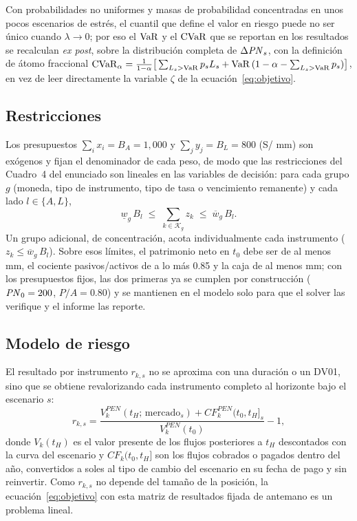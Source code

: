 Con probabilidades no uniformes y masas de probabilidad concentradas en unos pocos escenarios de estrés, el
cuantil que define el valor en riesgo puede no ser único cuando $\lambda \to 0$; por eso el $\operatorname{VaR}$ y el
$\operatorname{CVaR}$ que se reportan en los resultados se recalculan \emph{ex post}, sobre la distribución completa de
$\Delta \mathit{PN}_s$, con la definición de átomo fraccional
$\operatorname{CVaR}_\alpha = \frac{1}{1-\alpha}\big[\sum_{L_s > \operatorname{VaR}} p_s L_s + \operatorname{VaR}\,(1-\alpha - \sum_{L_s > \operatorname{VaR}} p_s)\big]$,
en vez de leer directamente la variable $\zeta$ de la ecuación~\eqref{eq:objetivo}.

\subsection{Restricciones}
Los presupuestos $\sum_i x_i = B_A = 1{,}000$ y $\sum_j y_j = B_L = 800$ (S/ mm) son exógenos y fijan el
denominador de cada peso, de modo que las restricciones del Cuadro~4 del enunciado son lineales en las variables
de decisión: para cada grupo $g$ (moneda, tipo de instrumento, tipo de tasa o vencimiento remanente) y cada
lado $l \in \{A, L\}$,
\begin{equation}
  \underline{w}_g\, B_l \;\le\; \sum_{k \in \mathcal{K}_g} z_k \;\le\; \overline{w}_g\, B_l.
  \label{eq:pesos}
\end{equation}
Un grupo adicional, de concentración, acota individualmente cada instrumento ($z_k \le \overline{w}_g\, B_l$).
Sobre esos límites, el patrimonio neto en $t_0$ debe ser de al menos  mm, el cociente pasivos/activos
de a lo más 0.85 y la caja de al menos  mm; con los presupuestos fijos, las dos primeras ya se cumplen
por construcción ($\mathit{PN}_0 = 200$, $P/A = 0.80$) y se mantienen en el modelo solo para que el solver las
verifique y el informe las reporte.

\subsection{Modelo de riesgo}\label{sec:riesgo}
El resultado por instrumento $r_{k,s}$ no se aproxima con una duración o un DV01, sino que se obtiene
revalorizando cada instrumento completo al horizonte bajo el escenario $s$:
\begin{equation}
  r_{k,s} = \frac{V_k^{PEN}(t_H;\,\text{mercado}_s) + CF_k^{PEN}(t_0, t_H]_s}{V_k^{PEN}(t_0)} - 1,
\end{equation}
donde $V_k(t_H)$ es el valor presente de los flujos posteriores a $t_H$ descontados con la curva del
escenario y $CF_k(t_0, t_H]$ son los flujos cobrados o pagados dentro del año, convertidos a soles al tipo de
cambio del escenario en su fecha de pago y sin reinvertir. Como $r_{k,s}$ no depende del tamaño de la
posición, la ecuación~\eqref{eq:objetivo} con esta matriz de resultados fijada de antemano es un problema
lineal.

